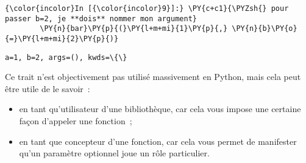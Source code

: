     \begin{Verbatim}[commandchars=\\\{\},frame=single,framerule=0.3mm,rulecolor=\color{cellframecolor}]
{\color{incolor}In [{\color{incolor}9}]:} \PY{c+c1}{\PYZsh{} pour passer b=2, je **dois** nommer mon argument}
        \PY{n}{bar}\PY{p}{(}\PY{l+m+mi}{1}\PY{p}{,} \PY{n}{b}\PY{o}{=}\PY{l+m+mi}{2}\PY{p}{)}
\end{Verbatim}


    \begin{Verbatim}[commandchars=\\\{\},frame=single,framerule=0.3mm,rulecolor=\color{cellframecolor}]
a=1, b=2, args=(), kwds=\{\}
\end{Verbatim}

    Ce trait n'est objectivement pas utilisé massivement en Python, mais
cela peut être utile de le savoir~:

\begin{itemize}
\tightlist
\item
  en tant qu'utilisateur d'une bibliothèque, car cela vous impose une
  certaine façon d'appeler une fonction~;
\item
  en tant que concepteur d'une fonction, car cela vous permet de
  manifester qu'un paramètre optionnel joue un rôle particulier.
\end{itemize}


    
    
    
